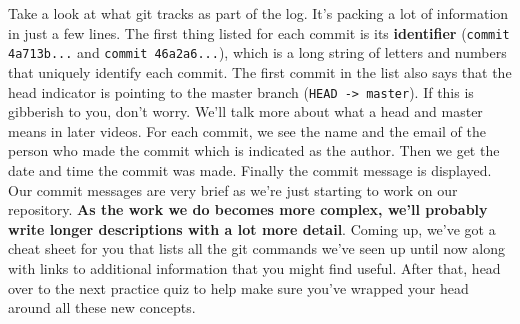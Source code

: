 	Take a look at what git tracks as part of the log. It's packing a lot of information in just a few lines. The first thing listed for each commit is its \textbf{identifier} (\texttt{commit 4a713b...} and \texttt{commit 46a2a6...}), which is a long string of letters and numbers that uniquely identify each commit. The first commit in the list also says that the head indicator is pointing to the master branch (\verb|HEAD -> master|). 
	If this is gibberish to you, don't worry. We'll talk more about what a head and master means in later videos. For each commit, we see the name and the email of the person who made the commit which is indicated as the author. Then we get the date and time the commit was made. Finally the commit message is displayed. Our commit messages are very brief as we're just starting to work on our repository. \textbf{As the work we do becomes more complex, we'll probably write longer descriptions with a lot more detail}. Coming up, we've got a cheat sheet for you that lists all the git commands we've seen up until now along with links to additional information that you might find useful. After that, head over to the next practice quiz to help make sure you've wrapped your head around all these new concepts.
	
	
	
	

